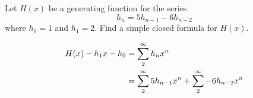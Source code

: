 \documentclass{article}
\begin{document}
Let \(H(x)\) be a generating function for the series \[h_n=5h_{n-1}-6h_{n-2}\] where \(h_0=1\) and \(h_1=2\). Find a simple closed formula for \(H(x)\).

\begin{align*}
	H(x) - h_1x - h_0 
	&= \sum\limits_{2}^{\infty}  {h_nx^n}  \\
	&= \sum\limits_{2}^{\infty}  {5h_{n-1}x^n}  + \sum\limits_{2}^{\infty}  {-6h_{n-2}x^n} 
\end{align*}
\end{document}
